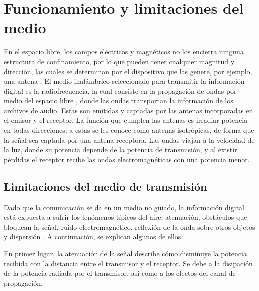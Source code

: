 

\section{Funcionamiento y limitaciones del medio}

En el espacio libre, los campos eléctricos y magnéticos no los encierra ninguna estructura de confinamiento, por lo que pueden tener cualquier magnitud y dirección, las cuales se determinan por el dispositivo que las genere, por ejemplo, una antena \cite{Hyatt}.
El medio inalámbrico seleccionado para transmitir la información digital es la radiofrecuencia, la cual consiste en la propagación de ondas por medio del espacio libre \cite{Hyatt}, donde las ondas transportan la información de los archivos de audio.
Estas son emitidas y captadas por las antenas incorporadas en el emisor y el receptor.
La función que cumplen las antenas es irradiar potencia en todas direcciones; a estas se les conoce como antenas isotrópicas, de forma que la señal sea captada por una antena receptora.
Las ondas viajan a la velocidad de la luz, donde su potencia depende de la potencia de transmisión, y al existir pérdidas el receptor recibe las ondas electromagnéticas con una potencia menor.

\subsection{Limitaciones del medio de transmisión}

Dado que la comunicación se da en un medio no guiado, la información digital está expuesta a sufrir los fenómenos típicos del aire: atenuación, obstáculos que bloquean la señal, ruido electromagnético, reflexión de la onda sobre otros objetos y dispersión \cite{wireless}.
A continuación, se explican algunos de ellos.

En primer lugar, la atenuación de la señal describe cómo disminuye la potencia recibida con la distancia entre el transmisor y el receptor.
Se debe a la disipación de la potencia radiada por el transmisor, así como a los efectos del canal de propagación.

